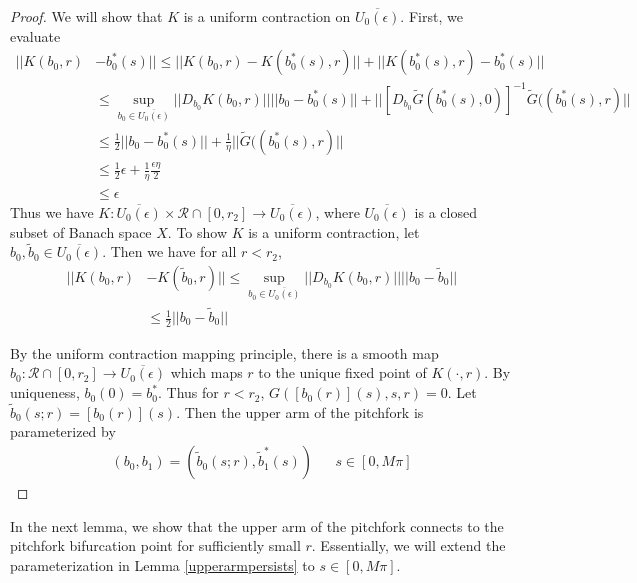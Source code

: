 \documentclass[thesis.tex]{subfiles}
\begin{document}
\begin{lemma}
\begin{proof}
We will show that $K$ is a uniform contraction on $\overline{U_0(\epsilon)}$. First, we evaluate
\begin{align*}
|| K(b_0, r) &- b_0^*(s) || \leq 
|| K(b_0, r) - K(b_0^*(s), r) || + 
|| K(b_0^*(s), r) - b_0^*(s) || \\
&\leq \sup_{b_0 \in \overline{U_0(\epsilon)}}||D_{b_0} K(b_0, r)|| ||b_0 - b_0^*(s)|| + ||[D_{b_0} \tilde{G}(b_0^*(s), 0)]^{-1} \tilde{G}((b_0^*(s), r)|| \\
&\leq \frac{1}{2}||b_0 - b_0^*(s)|| + \frac{1}{\eta}||\tilde{G}((b_0^*(s), r)|| \\
&\leq \frac{1}{2}\epsilon + \frac{1}{\eta}\frac{\epsilon \eta}{2} \\
&\leq \epsilon
\end{align*}
Thus we have $K: \overline{U_0(\epsilon)} \times \mathcal{R} \cap [0, r_2] \rightarrow \overline{U_0(\epsilon)}$, where $\overline{U_0(\epsilon)}$ is a closed subset of Banach space $X$. To show $K$ is a uniform contraction, let $b_0, \tilde{b}_0 \in \overline{U_0(\epsilon)}$. Then we have for all $r < r_2$,
\begin{align*}
|| K(b_0, r) &- K(\tilde{b}_0, r) || 
\leq \sup_{b_0 \in \overline{U_0(\epsilon)}}||D_{b_0} K(b_0, r)|| ||b_0 - \tilde{b}_0 || \\
&\leq \frac{1}{2}||b_0 - \tilde{b}_0 ||
\end{align*}

By the uniform contraction mapping principle, there is a smooth map $b_0 : \mathcal{R} \cap [0, r_2] \rightarrow  \overline{U_0(\epsilon)}$ which maps $r$ to the unique fixed point of $K(\cdot, r)$. By uniqueness, $b_0(0) = b_0^*$. Thus for $r < r_2$, $G([b_0(r)](s), s, r) = 0$. Let $\tilde{b}_0(s; r) = [b_0(r)](s)$. Then the upper arm of the pitchfork is parameterized by
\begin{align*}
(b_0, b_1) = (\tilde{b}_0(s; r), \tilde{b}^*_1(s)) && s \in [0, M \pi]
\end{align*}

\end{proof}
\end{lemma} 

In the next lemma, we show that the upper arm of the pitchfork connects to the pitchfork bifurcation point for sufficiently small $r$. Essentially, we will extend the parameterization in Lemma \ref{upperarmpersists} to $s \in [0, M \pi]$.
\end{document}
